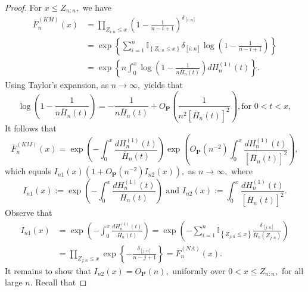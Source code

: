 \documentclass[reqno,openbib,runningheads,a4paper,12pt]{amsart}%
\begin{document}
\begin{proof}
For $x\leq Z_{n:n},$ we have%
\begin{align*}
\overline{F}_{n}^{\left(  KM\right)  }\left(  x\right)   &  =\prod
_{Z_{i:n}\leq x}\left(  1-\frac{1}{n-i+1}\right)  ^{\delta_{\left[
i:n\right]  }}\\
&  =\exp\left\{  \sum_{i=1}^{n}\mathbb{I}_{\left\{  Z_{i:n}\leq x\right\}
}\delta_{\left[  i:n\right]  }\log\left(  1-\frac{1}{n-i+1}\right)  \right\}
\\
&  =\exp\left\{  n\int_{0}^{x}\log\left(  1-\frac{1}{n\overline{H}_{n}\left(
t\right)  }\right)  dH_{n}^{\left(  1\right)  }\left(  t\right)  \right\}  .
\end{align*}
Using Taylor's expansion, as $n\rightarrow\infty,$ yields that%
\[
\log\left(  1-\frac{1}{n\overline{H}_{n}\left(  t\right)  }\right)  =-\frac
{1}{n\overline{H}_{n}\left(  t\right)  }+O_{\mathbf{P}}\left(  \frac{1}%
{n^{2}\left[  \overline{H}_{n}\left(  t\right)  \right]  ^{2}}\right)  ,\text{
for }0<t<x,
\]
It follows that%
\[
\overline{F}_{n}^{\left(  KM\right)  }\left(  x\right)  =\exp\left(  -\int%
_{0}^{x}\frac{dH_{n}^{\left(  1\right)  }\left(  t\right)  }{\overline{H}%
_{n}\left(  t\right)  }\right)  \exp\left(  O_{\mathbf{P}}\left(
n^{-2}\right)  \int_{0}^{x}\frac{dH_{n}^{\left(  1\right)  }\left(  t\right)
}{\left[  \overline{H}_{n}\left(  t\right)  \right]  ^{2}}\right)  ,
\]
which equals $I_{n1}\left(  x\right)  \left(  1+O_{\mathbf{P}}\left(
n^{-2}\right)  I_{n2}\left(  x\right)  \right)  ,$ as $n\rightarrow\infty,$
where
\[
I_{n1}\left(  x\right)  :=\exp\left(  -\int_{0}^{x}\frac{dH_{n}^{\left(
1\right)  }\left(  t\right)  }{\overline{H}_{n}\left(  t\right)  }\right)
\text{ and }I_{n2}\left(  x\right)  :=\int_{0}^{x}\frac{dH_{n}^{\left(
1\right)  }\left(  t\right)  }{\left[  \overline{H}_{n}\left(  t\right)
\right]  ^{2}}.
\]
Observe that%
\begin{align*}
I_{n1}\left(  x\right)   &  =\exp\left(  -\int_{0}^{x}\frac{dH_{n}^{\left(
1\right)  }\left(  t\right)  }{\overline{H}_{n}\left(  t\right)  }\right)
=\exp\left(  -\sum_{i=1}^{n}\mathbb{I}_{\left\{  Z_{j:n}\leq x\right\}  }%
\frac{\delta_{\left[  j:n\right]  }}{\overline{H}_{n}\left(  Z_{j:n}\right)
}\right)  \\
&  =\prod_{Z_{j:n}\leq x}\exp\left\{  -\frac{\delta_{\left[  j:n\right]  }%
}{n-j+1}\right\}  =\overline{F}_{n}^{\left(  NA\right)  }\left(  x\right)  .
\end{align*}
It remains to show that $I_{n2}\left(  x\right)  =O_{\mathbf{P}}\left(
n\right)  ,$ uniformly over $0<x\leq Z_{n:n},$ for all large $n.$ Recall that

\end{proof}
\end{document}
